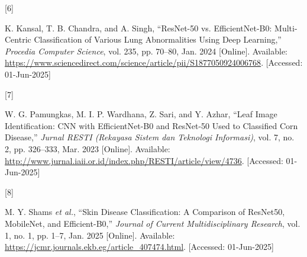 \documentclass[
  journal,
]{IEEEtran}%
\newlength{\cslhangindent}
\newlength{\csllabelwidth}
\newenvironment{CSLReferences}[2] %
 {\begin{list}{}{%
  \setlength{\itemindent}{0pt}
  \setlength{\leftmargin}{0pt}
  \setlength{\parsep}{0pt}
  \ifodd #1
   \setlength{\leftmargin}{\cslhangindent}
   \setlength{\itemindent}{-1\cslhangindent}
  \fi
  \setlength{\itemsep}{#2\baselineskip}}}
 {\end{list}}
\newcommand{\CSLLeftMargin}[1]{\parbox[t]{\csllabelwidth}{\strut#1\strut}}
\newcommand{\CSLRightInline}[1]{\parbox[t]{\linewidth - \csllabelwidth}{\strut#1\strut}}
\providecommand{\bibfont}{\footnotesize}
\begin{document}
\begin{CSLReferences}{0}{0}
\CSLLeftMargin{{[}6{]} }%
\CSLRightInline{K. Kansal, T. B. Chandra, and A. Singh, {``{ResNet}-50
vs. {EfficientNet}-{B0}: {Multi}-{Centric} {Classification} of {Various}
{Lung} {Abnormalities} {Using} {Deep} {Learning},''} \emph{Procedia
Computer Science}, vol. 235, pp. 70--80, Jan. 2024 {[}Online{]}.
Available:
\url{https://www.sciencedirect.com/science/article/pii/S1877050924006768}.
{[}Accessed: 01-Jun-2025{]}}

\CSLLeftMargin{{[}7{]} }%
\CSLRightInline{W. G. Pamungkas, M. I. P. Wardhana, Z. Sari, and Y.
Azhar, {``Leaf {Image} {Identification}: {CNN} with {EfficientNet}-{B0}
and {ResNet}-50 {Used} to {Classified} {Corn} {Disease},''} \emph{Jurnal
RESTI (Rekayasa Sistem dan Teknologi Informasi)}, vol. 7, no. 2, pp.
326--333, Mar. 2023 {[}Online{]}. Available:
\url{http://www.jurnal.iaii.or.id/index.php/RESTI/article/view/4736}.
{[}Accessed: 01-Jun-2025{]}}

\CSLLeftMargin{{[}8{]} }%
\CSLRightInline{M. Y. Shams \emph{et al.}, {``Skin {Disease}
{Classification}: {A} {Comparison} of {ResNet50}, {MobileNet}, and
{Efficient}-{B0},''} \emph{Journal of Current Multidisciplinary
Research}, vol. 1, no. 1, pp. 1--7, Jan. 2025 {[}Online{]}. Available:
\url{https://jcmr.journals.ekb.eg/article_407474.html}. {[}Accessed:
01-Jun-2025{]}}

\end{CSLReferences}


\ifCLASSOPTIONcaptionsoff
  \newpage
\fi



\pagebreak[3]
\end{document}
